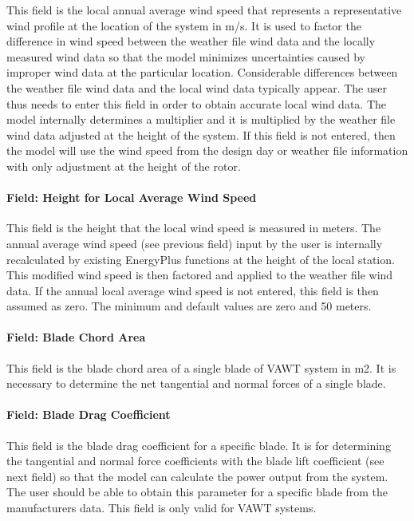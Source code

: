 This field is the local annual average wind speed that represents a representative wind profile at the location of the system in m/s. It is used to factor the difference in wind speed between the weather file wind data and the locally measured wind data so that the model minimizes uncertainties caused by improper wind data at the particular location. Considerable differences between the weather file wind data and the local wind data typically appear. The user thus needs to enter this field in order to obtain accurate local wind data. The model internally determines a multiplier and it is multiplied by the weather file wind data adjusted at the height of the system. If this field is not entered, then the model will use the wind speed from the design day or weather file information with only adjustment at the height of the rotor.

\paragraph{Field: Height for Local Average Wind Speed}\label{field-height-for-local-average-wind-speed}

This field is the height that the local wind speed is measured in meters. The annual average wind speed (see previous field) input by the user is internally recalculated by existing EnergyPlus functions at the height of the local station. This modified wind speed is then factored and applied to the weather file wind data. If the annual local average wind speed is not entered, this field is then assumed as zero. The minimum and default values are zero and 50 meters.

\paragraph{Field: Blade Chord Area}\label{field-blade-chord-area}

This field is the blade chord area of a single blade of VAWT system in m2. It is necessary to determine the net tangential and normal forces of a single blade.

\paragraph{Field: Blade Drag Coefficient}\label{field-blade-drag-coefficient}

This field is the blade drag coefficient for a specific blade. It is for determining the tangential and normal force coefficients with the blade lift coefficient (see next field) so that the model can calculate the power output from the system. The user should be able to obtain this parameter for a specific blade from the manufacturers data. This field is only valid for VAWT systems.

